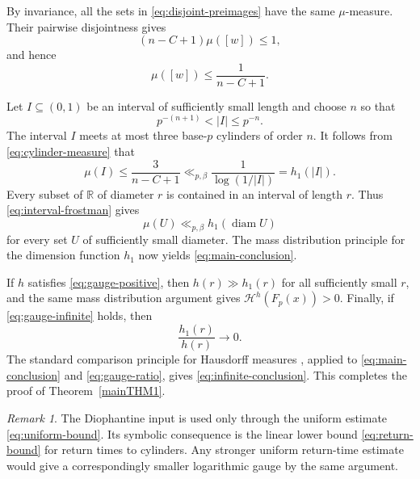 \documentclass[11pt]{article}
\theoremstyle{remark}
\newtheorem{remark}[theorem]{Remark}
\newcommand{\Haus}{\mathcal{H}}
\newcommand{\Fp}{F_p}
\newcommand{\vp}[1]{{\color{red}  {#1}}}
\begin{document}
By invariance, all the sets in \eqref{eq:disjoint-preimages} have
the same $\mu$-measure.  Their pairwise disjointness gives
\begin{equation}  \label{eq:cylinder-sum}
    (n-C+1)\mu([w])\leq1,
\end{equation}
and hence
\begin{equation} \label{eq:cylinder-measure}
    \mu([w])\leq\frac{1}{n-C+1}.
\end{equation}

Let $I\subseteq(0,1)$ be an interval of sufficiently small length
and choose $n$ so that
\begin{equation} \label{eq:choice-n}
    p^{-(n+1)}<|I|\leq p^{-n}.
\end{equation}
The interval $I$ meets at most three base-$p$ cylinders of order
$n$. It follows from \eqref{eq:cylinder-measure} that
\begin{equation} \label{eq:interval-frostman}
    \mu(I)\leq\frac{3}{n-C+1}
    \ll_{p,\beta}\frac{1}{\log(1/|I|)}
    =h_1(|I|).
\end{equation}
Every subset of $\mathbb R$ of diameter $r$ is contained in an
interval of length $r$.  Thus \eqref{eq:interval-frostman} gives
\begin{equation} \label{eq:frostman-bound}
    \mu(U)\ll_{p,\beta}h_1(\operatorname{diam}U)
\end{equation}
for every set $U$ of sufficiently small diameter.  The mass
distribution principle for the dimension function $h_1$
\cite[Section~2.1]{BeresnevichVelani2006} now yields
\eqref{eq:main-conclusion}.

If $h$ satisfies \eqref{eq:gauge-positive}, then $h(r)\gg h_1(r)$
for all sufficiently small $r$, and the same mass distribution
argument gives $\Haus^h(\Fp(x))>0$.  Finally, if
\eqref{eq:gauge-infinite} holds, then
\begin{equation} \label{eq:gauge-ratio}
    \frac{h_1(r)}{h(r)}\longrightarrow0.
\end{equation}
The standard comparison principle for Hausdorff measures
\cite[Lemma~1]{BeresnevichVelani2006}, applied to
\eqref{eq:main-conclusion} and \eqref{eq:gauge-ratio}, gives
\eqref{eq:infinite-conclusion}.  This completes the proof of
Theorem~\ref{mainTHM1}.

%

\begin{remark}
The Diophantine input is used only through the uniform estimate
\eqref{eq:uniform-bound}.  Its symbolic consequence is the linear
lower bound \eqref{eq:return-bound} for return times to cylinders.
Any stronger uniform return-time estimate would give a
correspondingly smaller logarithmic gauge by the same argument.
\end{remark}
\end{document}
